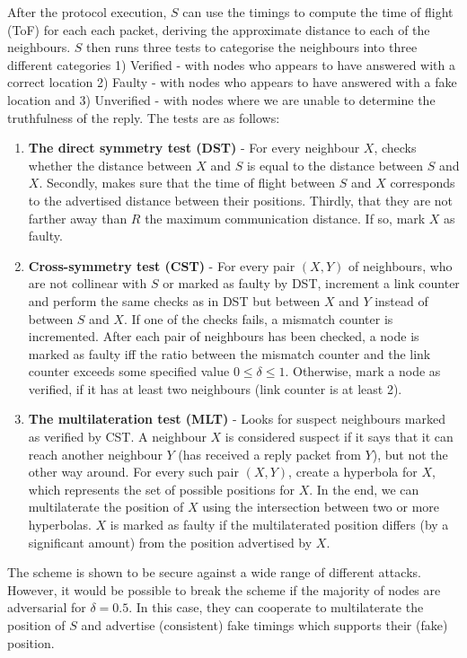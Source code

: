 \documentclass{article}
\begin{document}
After the protocol execution, $S$ can use the timings to compute the time of flight (ToF) for each each packet, deriving the approximate distance to each of the neighbours. $S$ then runs three tests to categorise the neighbours into three different categories 1) Verified - with nodes who appears to have answered with a correct location 2) Faulty - with nodes who appears to have answered with a fake location and 3) Unverified - with nodes where we are unable to determine the truthfulness of the reply.
\noindent
The tests are as follows:

\begin{enumerate}
    \item \textbf{The direct symmetry test (DST)} - For every neighbour $X$, checks whether the distance between $X$ and $S$ is equal to the distance between $S$ and $X$. Secondly, makes sure that the time of flight between $S$ and $X$ corresponds to the advertised distance between their positions. Thirdly, that they are not farther away than $R$ the maximum communication distance. If so, mark $X$ as faulty.
    \item \textbf{Cross-symmetry test (CST)} - For every pair $(X, Y)$ of neighbours, who are not collinear with $S$ or marked as faulty by DST, increment a link counter and perform the same checks as in DST but between $X$ and $Y$ instead of between $S$ and $X$. If one of the checks fails, a mismatch counter is incremented. After each pair of neighbours has been checked, a node is marked as faulty iff the ratio between the mismatch counter and the link counter exceeds some specified value $0 \le \delta \le 1$. Otherwise, mark a node as verified, if it has at least two neighbours (link counter is at least 2).
    \item \textbf{The multilateration test (MLT)} - Looks for suspect neighbours marked as verified by CST. A neighbour $X$ is considered suspect if it says that it can reach another neighbour $Y$ (has received a reply packet from $Y$), but not the other way around. For every such pair $(X, Y)$, create a hyperbola for $X$, which represents the set of possible positions for $X$. In the end, we can multilaterate the position of $X$ using the intersection between two or more hyperbolas. $X$ is marked as faulty if the multilaterated position differs (by a significant amount) from the position advertised by $X$.
\end{enumerate}
\noindent
The scheme is shown to be secure against a wide range of different attacks. However, it would be possible to break the scheme if the majority of nodes are adversarial for $\delta = 0.5$. In this case, they can cooperate to multilaterate the position of $S$ and advertise (consistent) fake timings which supports their (fake) position.


\end{document}
